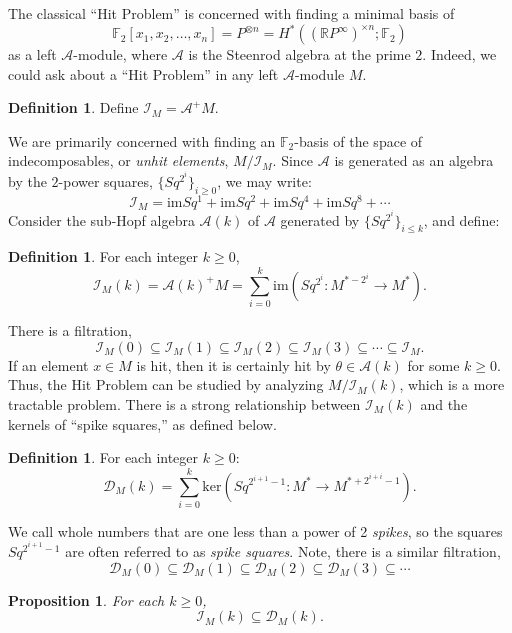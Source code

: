 \documentclass{amsart}
\theoremstyle{plain}
\newtheorem{proposition}[theorem]{Proposition}
\theoremstyle{definition}
\newtheorem{definition}[theorem]{Definition}
\theoremstyle{remark}
\begin{document}
The classical ``Hit Problem'' is concerned with finding a minimal
basis of
\[
  {\mathbb{F}}_2[x_1, x_2, \ldots, x_n] = P^{\otimes n} = H^*(({\mathbb{R}}
  P^{\infty})^{\times n}; {\mathbb{F}}_2)
\]
as a left $\mathcal{A}$-module, where $\mathcal{A}$ is the Steenrod
algebra at the prime $2$.  Indeed, we could ask about a ``Hit
Problem'' in any left $\mathcal{A}$-module $M$.
\begin{definition}
  Define $\mathcal{I}_M = \mathcal{A}^+M$.  
\end{definition}
We are primarily concerned with finding an ${\mathbb{F}}_2$-basis of the space
of indecomposables, or {\it unhit elements}, $M/\mathcal{I}_M$.  Since
$\mathcal{A}$ is generated as an algebra by the $2$-power squares,
$\{Sq^{2^i}\}_{i \geq 0}$, we may write:
\[
  \mathcal{I}_M = \mathrm{im} Sq^1 + \mathrm{im} Sq^2 + \mathrm{im}
  Sq^4 + \mathrm{im} Sq^8 + \cdots
\]
Consider the sub-Hopf algebra $\mathcal{A}(k)$ of $\mathcal{A}$
generated by $\{Sq^{2^i}\}_{i \leq k}$, and define:
\begin{definition}\label{def.I}
  For each integer $k \geq 0$,
  \[
    \mathcal{I}_M(k) = \mathcal{A}(k)^+M = \sum_{i=0}^{k} \mathrm{im}
    \left(Sq^{2^i} : M^{*-2^i} \to M^*\right).
  \]
\end{definition}
There is a filtration,
\[
  \mathcal{I}_M(0) \subseteq \mathcal{I}_M(1) \subseteq
  \mathcal{I}_M(2) \subseteq \mathcal{I}_M(3) \subseteq \cdots
  \subseteq \mathcal{I}_M.
\]
If an element $x \in M$ is hit, then it is certainly hit by $\theta
\in \mathcal{A}(k)$ for some $k \geq 0$.  Thus, the Hit Problem can be
studied by analyzing $M/\mathcal{I}_M(k)$, which is a more tractable
problem.  There is a strong relationship between $\mathcal{I}_M(k)$
and the kernels of ``spike squares,'' as defined below.
\begin{definition}\label{def.D}
  For each integer $k \geq 0$:
  \[
    \mathcal{D}_M(k) = \sum_{i=0}^{k} \mathrm{ker}
    \left(Sq^{2^{i+1}-1} : M^{*} \to M^{*+2^{i+i} - 1}\right).
  \]
\end{definition}
We call whole numbers that are one less than a power of 2 {\it
  spikes}, so the squares $Sq^{2^{i+1}-1}$ are often referred to as
{\it spike squares}.  Note, there is a similar filtration,
\[
  \mathcal{D}_M(0) \subseteq \mathcal{D}_M(1) \subseteq
  \mathcal{D}_M(2) \subseteq \mathcal{D}_M(3) \subseteq \cdots
\]
\begin{proposition}\label{prp.inclusion}
  For each $k \geq 0$,
  \begin{equation}\label{eqn.inclusion}
    \mathcal{I}_M(k) \subseteq \mathcal{D}_M(k).
  \end{equation}
\end{proposition}
\end{document}
